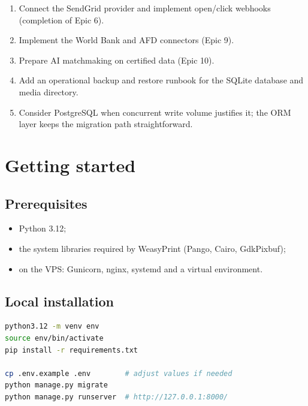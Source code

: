 \documentclass[11pt,a4paper]{article}
\begin{document}
\begin{enumerate}[leftmargin=1.8em,itemsep=3pt]
  \item Connect the SendGrid provider and implement open/click webhooks
        (completion of Epic 6).
  \item Implement the World Bank and AFD connectors (Epic 9).
  \item Prepare AI matchmaking on certified data (Epic 10).
  \item Add an operational backup and restore runbook for the SQLite database
        and media directory.
  \item Consider PostgreSQL when concurrent write volume justifies it; the ORM
        layer keeps the migration path straightforward.
\end{enumerate}

\section{Getting started}
\label{sec:start}

\subsection{Prerequisites}

\begin{itemize}[leftmargin=1.4em,itemsep=2pt]
  \item Python 3.12;
  \item the system libraries required by WeasyPrint (Pango, Cairo, GdkPixbuf);
  \item on the VPS: Gunicorn, nginx, systemd and a virtual environment.
\end{itemize}

\subsection{Local installation}

\begin{lstlisting}[language=bash]
python3.12 -m venv env
source env/bin/activate
pip install -r requirements.txt

cp .env.example .env        # adjust values if needed
python manage.py migrate
python manage.py runserver  # http://127.0.0.1:8000/
\end{lstlisting}
\end{document}
